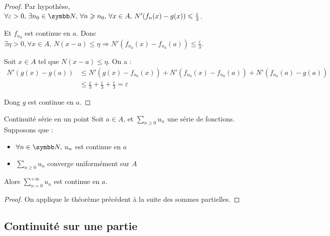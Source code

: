 \begin{proof}
    Par hypothèse, $\forall \varepsilon > 0, \, \exists n_0 \in \N, \, \forall n \geqslant n_0, \, \forall x \in A, \, N'(f_n(x) - g(x)) \leqslant \frac \varepsilon 3$.

    Et $f_{n_0}$ est continue en $a$. Donc $\exists \eta > 0, \forall x \in A, \, N(x - a) \leqslant \eta \Rightarrow N'(f_{n_0}(x) - f_{n_0}(a)) \leqslant \frac \varepsilon 3$.

    Soit $x \in A$ tel que $N(x - a) \leqslant \eta$. On a :
    \begin{align*}
        N'(g(x) - g(a)) & \leqslant N'(g(x) - f_{n_0}(x)) + N'(f_{n_0}(x) - f_{n_0}(a)) + N'(f_{n_0}(a) - g(a)) \\
        & \leqslant \frac \varepsilon 3 + \frac \varepsilon 3 + \frac \varepsilon 3 = \varepsilon
    \end{align*}

    Dong $g$ est continue en $a$.
\end{proof}

\begin{theoreme}{Continuité série en un point}{}
    Soit $a \in A$, et $\displaystyle \sum_{n \geqslant 0} u_n$ une série de fonctions. Supposons que : 
    \begin{itemize}
        \item $\forall n \in \N, \, u_n$ est continue en $a$
        \item $\displaystyle \sum_{n \geqslant 0} u_n$ converge uniformément sur $A$ 
    \end{itemize}
    Alors $\displaystyle \sum_{n = 0}^{+ \infty} u_n$ est continue en $a$.
\end{theoreme}

\begin{proof}
    On applique le théorème précédent à la suite des sommes partielles.
\end{proof}

\subsection{Continuité sur une partie}

